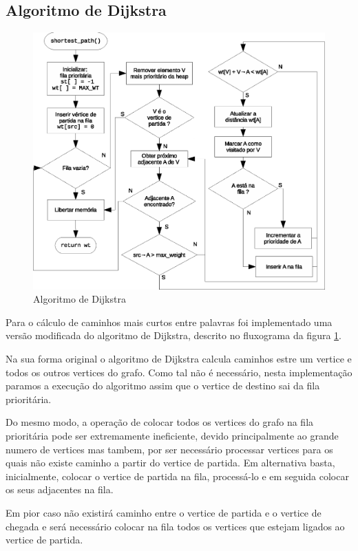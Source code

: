 \documentclass[a4paper, 18pt]{article}
\begin{document}
\subsection{Algoritmo de Dijkstra}
\label{sec:alg_dijkstra}
	\begin{figure}[H]
		\centering
		\label{fig:dijkstra}
		\includegraphics[width=0.85\linewidth]{dijkstra}
		\caption{Algoritmo de Dijkstra}
	\end{figure}

	\par
	Para o cálculo de caminhos mais curtos entre palavras foi implementado 
uma versão modificada do algoritmo de Dijkstra, descrito no fluxograma da 
figura \ref{fig:dijkstra}.
	\par
	Na sua forma original o algoritmo de Dijkstra calcula caminhos estre um 
vertice e todos os outros vertices do grafo. Como tal não é necessário, nesta 
implementação paramos a execução do algoritmo assim que o vertice de destino 
sai da fila prioritária.
	\par
	Do mesmo modo, a operação de colocar 
todos os vertices do grafo na fila prioritária pode ser extremamente 
ineficiente, devido principalmente ao grande numero de vertices mas tambem, por 
ser necessário processar vertices para os quais não existe caminho a partir do 
vertice de partida. Em alternativa basta, inicialmente, colocar o vertice de 
partida na fila, processá-lo e em seguida colocar os seus adjacentes na fila. 
	\par Em pior caso não existirá caminho entre o vertice de partida e o 
vertice de chegada e será necessário colocar na fila todos os vertices 
que estejam ligados ao vertice de partida.     
\end{document}
